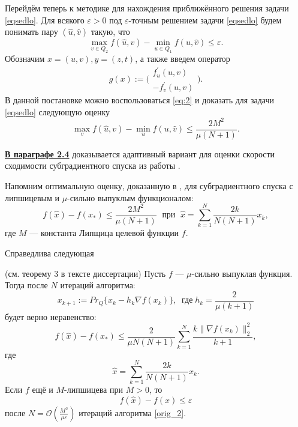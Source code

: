     Перейдём теперь к методике для нахождения приближённого решения задачи \eqref{eqsedlo}. Для всякого $\varepsilon > 0$ под $\varepsilon$-точным решением задачи \eqref{eqsedlo} будем понимать пару $(\widehat{u}, \widehat{v})$ такую, что $$\max_{v \in Q_2} f(\widehat{u}, v) - \min_{u \in Q_1} f(u, \widehat{v}) \leq \varepsilon.$$ Обозначим $x = (u, v), y = (z, t)$, а также введем оператор 
    \begin{equation}\label{operator-sedlo}
        g(x) := \Bigg( 
        \begin{aligned}
            f^{'}_{u}(u,v)\\
            -f^{'}_{v}(u,v)
        \end{aligned}
        \Bigg).
    \end{equation}
    В данной постановке можно воспользоваться \eqref{eq:2} и доказать для задачи \eqref{eqsedlo} следующую оценку
    \begin{equation}
        \max_{v} f(\widehat{u}, v) - \min_{u} f(u, \widehat{v}) \leq \frac{2M^2}{\mu (N+1)}.
    \end{equation}
\fi

\underline{\textbf{В параграфе 2.4}} доказывается адаптивный вариант для оценки скорости сходимости субградиентного спуска из работы \cite{Bach_2012}. 

Напомним оптимальную оценку, доказанную в \cite{Bach_2012}, для субградиентного спуска с липшицевым и $\mu$-сильно выпуклым функционалом:
\begin{equation}\label{orig_estimation_f}
    f(\widehat{x}) - f(x_*) \leq \frac{2 M^2}{\mu (N+1)}  \; \text{  при   } \; \widehat{x} = \sum\limits_{k=1}^{N} \frac{2 k}{N (N+1)} x_k, 
\end{equation}
где $M$ --- константа Липщица целевой функции $f$.

Справедлива следующая
\begin{theorem}\label{ThmBachAdaptive} (см. теорему 3 в тексте диссертации)
    Пусть $f$ --- $\mu$-сильно выпуклая функция. Тогда после $N$ итераций алгоритма:
    \begin{equation}\label{orig_2}
        x_{k+1} := Pr_{Q}\{x_k - h_k \nabla f(x_k) \}, \;\; \textit{где} \; h_k = \frac{2}{\mu (k+1)}
    \end{equation}
    будет верно неравенство:
    \begin{equation}\label{adaptive_estimation_f}
        f(\widehat{x}) - f(x_*) \leq \frac{2}{\mu N (N+1)} \sum_{k=1}^{N} \frac{k \|\nabla f(x_k)\|_2^2}{k+1},
    \end{equation}
    где
    $$
        \widehat{x} = \sum_{k=1}^{N} \frac{2 k}{N (N+1)} x_k.
    $$
    Если $f$ ещё и $M$-липшицева при $M >0$, то
    $$
         f(\widehat{x}) - f(x) \leq \varepsilon
    $$
    после $N = \mathcal{O}(\frac{M^2}{\mu\varepsilon})$ итераций алгоритма \eqref{orig_2}.
\end{theorem}

